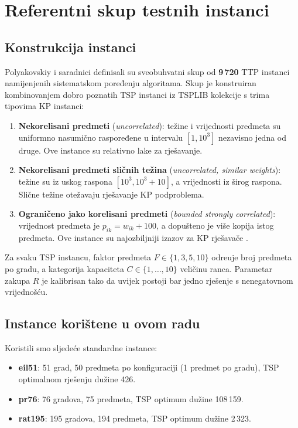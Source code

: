 \documentclass[12pt,a4paper]{article}
\begin{document}
\section{Referentni skup testnih instanci}

\subsection{Konstrukcija instanci}

Polyakovskiy i saradnici \cite{polyakovskiy2014} definisali su sveobuhvatni skup od \textbf{9\,720} TTP instanci namijenjenih sistematskom poređenju algoritama. Skup je konstruiran kombinovanjem dobro poznatih TSP instanci iz TSPLIB kolekcije \cite{reinelt1991} s trima tipovima KP instanci:

\begin{enumerate}
    \item \textbf{Nekorelisani predmeti} (\textit{uncorrelated}): te\v{z}ine i vrijednosti predmeta su uniformno nasumi\v{c}no raspoređene u intervalu $[1, 10^3]$ nezavisno jedna od druge. Ove instance su relativno lake za rje\v{s}avanje.
    \item \textbf{Nekorelisani predmeti sli\v{c}nih te\v{z}ina} (\textit{uncorrelated, similar weights}): te\v{z}ine su iz uskog raspona $[10^3, 10^3+10]$, a vrijednosti iz \v{s}irog raspona. Sli\v{c}ne te\v{z}ine ote\v{z}avaju rje\v{s}avanje KP podproblema.
    \item \textbf{Ograni\v{c}eno jako korelisani predmeti} (\textit{bounded strongly correlated}): vrijednost predmeta je $p_{ik} = w_{ik} + 100$, a dopušteno je vi\v{s}e kopija istog predmeta. Ove instance su najozbiljniji izazov za KP rje\v{s}ava\v{c}e \cite{polyakovskiy2014}.
\end{enumerate}

Za svaku TSP instancu, faktor predmeta $F \in \{1, 3, 5, 10\}$ odre\dj{}uje broj predmeta po gradu, a kategorija kapaciteta $C \in \{1, \ldots, 10\}$ veli\v{c}inu ranca. Parametar zakupa $R$ je kalibrisan tako da uvijek postoji bar jedno rje\v{s}enje s nenegatovnom vrijednoš\'{c}u.

\subsection{Instance kori\v{s}tene u ovom radu}

Koristili smo sljede\'{c}e standardne instance:
\begin{itemize}
    \item \textbf{eil51}: 51 grad, 50 predmeta po konfiguraciji (1 predmet po gradu), TSP optimalnom rješenju du\v{z}ine 426.
    \item \textbf{pr76}: 76 gradova, 75 predmeta, TSP optimum du\v{z}ine 108\,159.
    \item \textbf{rat195}: 195 gradova, 194 predmeta, TSP optimum du\v{z}ine 2\,323.
\end{itemize}
\end{document}
